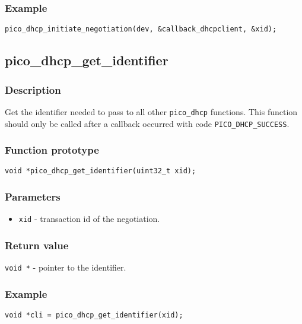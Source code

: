 \subsubsection*{Example}
\begin{verbatim}
pico_dhcp_initiate_negotiation(dev, &callback_dhcpclient, &xid);
\end{verbatim}


\subsection{pico\_dhcp\_get\_identifier}

\subsubsection*{Description}
Get the identifier needed to pass to all other \texttt{pico\_dhcp} functions. This function should only be called after a callback occurred with code \texttt{PICO\_DHCP\_SUCCESS}. 

\subsubsection*{Function prototype}
\texttt{void *pico\_dhcp\_get\_identifier(uint32\_t xid);}

\subsubsection*{Parameters}
\begin{itemize}[noitemsep]
\item \texttt{xid} - transaction id of the negotiation.
\end{itemize}

\subsubsection*{Return value}
\texttt{void *} - pointer to the identifier.


\subsubsection*{Example}
\begin{verbatim}
void *cli = pico_dhcp_get_identifier(xid);
\end{verbatim}


